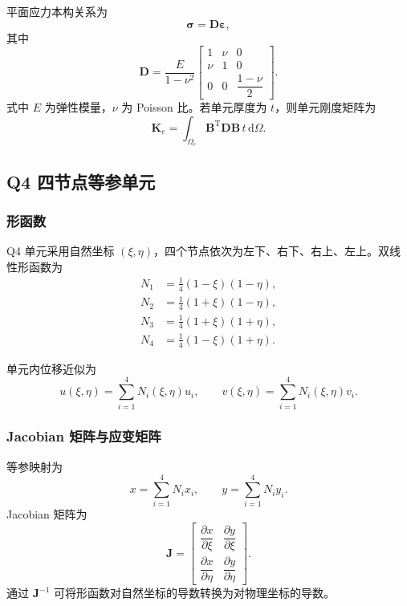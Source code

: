 \documentclass[UTF8,a4paper,zihao=-4]{ctexart}
\newcommand{\dd}{\mathrm{d}}
\newcommand{\T}{\mathrm{T}}
\newcommand{\Dmat}{\bm{D}}
\newcommand{\Bmat}{\bm{B}}
\newcommand{\Kmat}{\bm{K}}
\newcommand{\epsvec}{\bm{\varepsilon}}
\newcommand{\sigvec}{\bm{\sigma}}
\begin{document}
平面应力本构关系为
\begin{equation}
    \sigvec = \Dmat \epsvec ,
\end{equation}
其中
\begin{equation}
    \Dmat
    =
    \frac{E}{1-\nu^2}
    \begin{bmatrix}
        1 & \nu & 0\\
        \nu & 1 & 0\\
        0 & 0 & \dfrac{1-\nu}{2}
    \end{bmatrix}.
\end{equation}
式中 $E$ 为弹性模量，$\nu$ 为 Poisson 比。若单元厚度为 $t$，则单元刚度矩阵为
\begin{equation}
    \Kmat_e =
    \int_{\Omega_e}
    \Bmat^{\T}\Dmat\Bmat\,t\,\dd\Omega .
\end{equation}

\subsection{Q4 四节点等参单元}

\subsubsection{形函数}

Q4 单元采用自然坐标 $(\xi,\eta)$，四个节点依次为左下、右下、右上、左上。双线性形函数为
\begin{align}
    N_1 &= \frac{1}{4}(1-\xi)(1-\eta),\\
    N_2 &= \frac{1}{4}(1+\xi)(1-\eta),\\
    N_3 &= \frac{1}{4}(1+\xi)(1+\eta),\\
    N_4 &= \frac{1}{4}(1-\xi)(1+\eta).
\end{align}

单元内位移近似为
\begin{equation}
    u(\xi,\eta)=\sum_{i=1}^{4}N_i(\xi,\eta)u_i,\qquad
    v(\xi,\eta)=\sum_{i=1}^{4}N_i(\xi,\eta)v_i.
\end{equation}

\subsubsection{Jacobian 矩阵与应变矩阵}

等参映射为
\begin{equation}
    x=\sum_{i=1}^{4}N_i x_i,\qquad
    y=\sum_{i=1}^{4}N_i y_i.
\end{equation}
Jacobian 矩阵为
\begin{equation}
    \bm{J}
    =
    \begin{bmatrix}
        \dfrac{\partial x}{\partial \xi} &
        \dfrac{\partial y}{\partial \xi}\\[0.6em]
        \dfrac{\partial x}{\partial \eta} &
        \dfrac{\partial y}{\partial \eta}
    \end{bmatrix}.
\end{equation}
通过 $\bm{J}^{-1}$ 可将形函数对自然坐标的导数转换为对物理坐标的导数。
\end{document}
